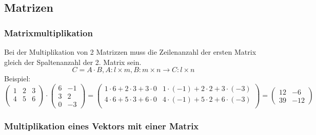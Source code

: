 \subsection{Matrizen} 
\label{sub:matrizen}

\subsubsection{Matrixmultiplikation} 
\label{ssub:matrixmultiplikation}

Bei der Multiplikation von 2 Matrizzen muss die Zeilenanzahl der ersten Matrix gleich der Spaltenanzahl der 2. Matrix sein. 
\begin{equation}
	C = A \cdot B, A : l \times m, B : m \times n \rightarrow C : l \times n
\end{equation}
Beispiel: 
\begin{displaymath}
	\left(\begin{array}{ccc}1 & 2 & 3 \\4 & 5 & 6 \\\end{array}\right) \cdot
	\left(\begin{array}{cc}6 & -1 \\3 & 2 \\0 & -3\end{array}\right)
	=\left(\begin{array}{cc}1 \cdot 6  +  2 \cdot 3  +  3 \cdot 0 &
	  1 \cdot (-1) +  2 \cdot 2 +  3 \cdot (-3) \\4 \cdot 6  +  5 \cdot 3  +  6 \cdot 0 &
	  4 \cdot (-1) +  5 \cdot 2 +  6 \cdot (-3) \\\end{array}\right)
	=\left(\begin{array}{cc}12 & -6 \\39 & -12\end{array}\right)
\end{displaymath}

\subsubsection{Multiplikation eines Vektors mit einer Matrix}
\label{ssub:multiplikation_eines_vektors_mit_einer_matrix}

